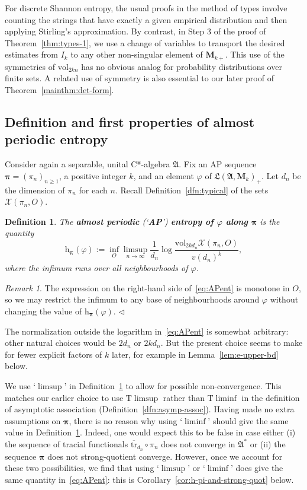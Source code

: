 \documentclass[12pt,a4paper]{article}
\numberwithin{equation}{section}
\newtheorem{dfn}[thm]{Definition}
\theoremstyle{remark}
\newtheorem{rmk}[thm]{Remark}
\newcommand{\bs}[1]{\boldsymbol{#1}}
\renewcommand{\rm}[1]{\mathrm{#1}}
\newcommand{\rmM}{\mathbf{M}}
\newcommand{\rmh}{\mathrm{h}}
\newcommand{\X}{\mathcal{X}}
\newcommand{\A}{\mathfrak{A}}
\newcommand{\frL}{\mathfrak{L}}
\renewcommand{\phi}{\varphi}
\newcommand{\fin}{\nolinebreak\hspace{\stretch{1}}$\lhd$}
\newcommand{\bspi}{\boldsymbol{\pi}}
\newcommand{\vol}{\mathrm{vol}}
\newcommand{\tr}{\overline{\mathrm{tr}}}
\begin{document}
For discrete Shannon entropy, the usual proofs in the method of types involve counting the strings that have exactly a given empirical distribution and then applying Stirling's approximation.  By contrast, in Step 3 of the proof of Theorem~\ref{thm:types-1}, we use a change of variables to transport the desired estimates from $I_k$ to any other non-singular element of $\rmM_{k+}$.  This use of the symmetries of $\vol_{2kn}$ has no obvious analog for probability distributions over finite sets.  A related use of symmetry is also essential to our later proof of Theorem~\ref{mainthm:det-form}.


\subsection{Definition and first properties of almost periodic entropy}\label{subs:APent}

Consider again a separable, unital C*-algebra $\A$.  Fix an AP sequence $\bspi = (\pi_n)_{n\ge 1}$, a positive integer $k$, and an element $\phi$ of $\frL(\A,\rmM_k)_+$.  Let $d_n$ be the dimension of $\pi_n$ for each $n$.  Recall Definition~\ref{dfn:typical} of the sets $\X(\pi_n,O)$.

\begin{dfn}\label{dfn:APent}
The \textbf{almost periodic} (`\textbf{AP}') \textbf{entropy of $\phi$ along $\bs{\pi}$} is the quantity
\begin{equation}\label{eq:APent}
 \rmh_{\bspi}(\phi) := \inf_O \limsup_{n \to\infty} \frac{1}{d_n}\log \frac{\vol_{2kd_n}\X(\pi_n,O)}{v(d_n)^k},
\end{equation}
where the infimum runs over all neighbourhoods of $\phi$.
\end{dfn}

\begin{rmk}\label{rmk:any-base-OK}
The expression on the right-hand side of~\eqref{eq:APent} is monotone in $O$, so we may restrict the infimum to any base of neighbourhoods around $\phi$ without changing the value of $\rmh_{\bspi}(\phi)$. \fin
\end{rmk}

The normalization outside the logarithm in~\eqref{eq:APent} is somewhat arbitrary: other natural choices would be $2d_n$ or $2kd_n$.  But the present choice seems to make for fewer explicit factors of $k$ later, for example in Lemma~\ref{lem:e-upper-bd} below.

	We use `$\limsup$' in Definition~\ref{dfn:APent} to allow for possible non-convergence. This matches our earlier choice to use $\rm{T}\limsup$ rather than $\rm{T}\liminf$ in the definition of asymptotic association (Definition~\ref{dfn:asymp-assoc}). Having made no extra assumptions on $\bspi$, there is no reason why using `$\liminf$' should give the same value in Definition~\ref{dfn:APent}.  Indeed, one would expect this to be false in case either (i) the sequence of tracial functionals $\tr_{d_n}\circ \pi_n$ does not converge in $\A^\ast$ or (ii) the sequence $\bspi$ does not strong-quotient converge.  However, once we account for these two possibilities, we find that using `$\limsup$' or `$\liminf$' does give the same quantity in~\eqref{eq:APent}: this is Corollary~\ref{cor:h-pi-and-strong-quot} below.
\end{document}
